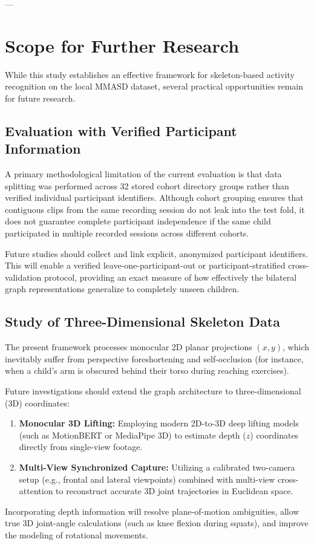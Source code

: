 ---

\section{Scope for Further Research}

While this study establishes an effective framework for skeleton-based activity recognition on the local MMASD dataset, several practical opportunities remain for future research.

\subsection{Evaluation with Verified Participant Information}

A primary methodological limitation of the current evaluation is that data splitting was performed across 32 stored cohort directory groups rather than verified individual participant identifiers. Although cohort grouping ensures that contiguous clips from the same recording session do not leak into the test fold, it does not guarantee complete participant independence if the same child participated in multiple recorded sessions across different cohorts.

Future studies should collect and link explicit, anonymized participant identifiers. This will enable a verified leave-one-participant-out or participant-stratified cross-validation protocol, providing an exact measure of how effectively the bilateral graph representations generalize to completely unseen children.

\subsection{Study of Three-Dimensional Skeleton Data}

The present framework processes monocular 2D planar projections $(x, y)$, which inevitably suffer from perspective foreshortening and self-occlusion (for instance, when a child’s arm is obscured behind their torso during reaching exercises). 

Future investigations should extend the graph architecture to three-dimensional (3D) coordinates:
\begin{enumerate}
    \item \textbf{Monocular 3D Lifting:} Employing modern 2D-to-3D deep lifting models (such as MotionBERT or MediaPipe 3D) to estimate depth ($z$) coordinates directly from single-view footage.
    \item \textbf{Multi-View Synchronized Capture:} Utilizing a calibrated two-camera setup (e.g., frontal and lateral viewpoints) combined with multi-view cross-attention to reconstruct accurate 3D joint trajectories in Euclidean space.
\end{enumerate}
Incorporating depth information will resolve plane-of-motion ambiguities, allow true 3D joint-angle calculations (such as knee flexion during squats), and improve the modeling of rotational movements.


